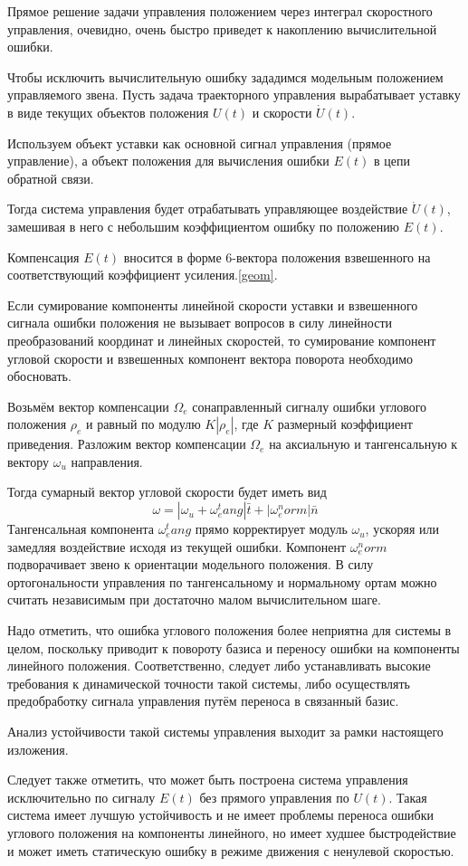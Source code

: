 Прямое решение задачи управления положением через интеграл скоростного управления, очевидно, очень быстро приведет к накоплению вычислительной ошибки.

Чтобы исключить вычислительную ошибку зададимся модельным положением управляемого звена. Пусть задача траекторного управления вырабатывает уставку в виде текущих объектов положения $U(t)$ и скорости $\dot{U}(t)$.

Используем объект уставки как основной сигнал управления (прямое управление), а объект положения для вычисления ошибки $E(t)$ в цепи обратной связи.

Тогда система управления будет отрабатывать управляющее воздействие $\dot{U}(t)$, замешивая в него с небольшим коэффициентом ошибку по положению $E(t)$.

Компенсация $E(t)$ вносится в форме 6-вектора положения взвешенного на соответствующий коэффициент усиления.\ref{geom}. 

Если сумирование компоненты линейной скорости уставки и взвешенного сигнала ошибки положения не вызывает вопросов в силу линейности преобразований координат и линейных скоростей, то сумирование компонент угловой скорости и взвешенных компонент вектора поворота необходимо обосновать.

Возьмём вектор компенсации $\Omega_e$ сонаправленный сигналу ошибки углового положения $\rho_e$ и равный по модулю $K|\rho_e|$, где $K$ размерный коэффициент приведения.
Разложим вектор компенсации $\Omega_e$ на аксиальную и тангенсальную к вектору $\omega_u$ направления.   

Тогда сумарный вектор угловой скорости будет иметь вид 
\begin{equation}
\omega = |\omega_u + \omega_e^tang|\bar{t} + |\omega_e^norm|\bar{n}
\end{equation} 
Тангенсальная компонента $\omega_e^tang$ прямо корректирует модуль $\omega_u$, ускоряя или замедляя воздействие исходя из текущей ошибки. Компонент $\omega_e^norm$ подворачивает звено к ориентации модельного положения. В силу ортогональности управления по тангенсальному и нормальному ортам можно считать независимым при достаточно малом вычислительном шаге.

Надо отметить, что ошибка углового положения более неприятна для системы в целом, поскольку приводит к повороту базиса и переносу ошибки на компоненты линейного положения. Соответственно, следует либо устанавливать высокие требования к динамической точности такой системы, либо осуществлять предобработку сигнала управления путём переноса в связанный базис. 

Анализ устойчивости такой системы управления выходит за рамки настоящего изложения.

Следует также отметить, что может быть построена система управления исключительно по сигналу $E(t)$ без прямого управления по $U(t)$. Такая система имеет лучшую устойчивость и не имеет проблемы переноса ошибки углового положения на компоненты линейного, но имеет худшее быстродействие и может иметь статическую ошибку в режиме движения с ненулевой скоростью.